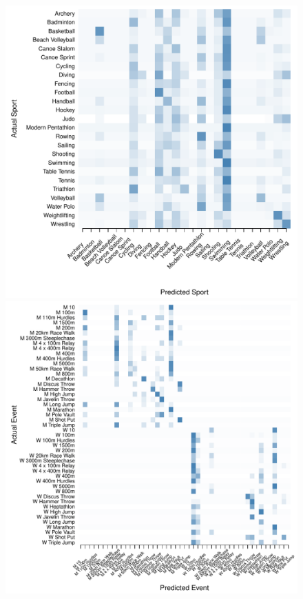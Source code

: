 \begin{figure}
\begin{center}
\begin{minipage}{0.20\textwidth}
\begin{center}
      \includegraphics[scale=0.20]{../graphics/sportEV-tst.pdf}
    \end{center}
  \end{minipage}
  \hspace{0.05\textwidth}
    \begin{minipage}{0.20\textwidth}
    \begin{center}
      \includegraphics[scale=0.20]{../graphics/athletesEV-trn.pdf}

\end{center}
\end{minipage}
\end{center}
\end{figure}
